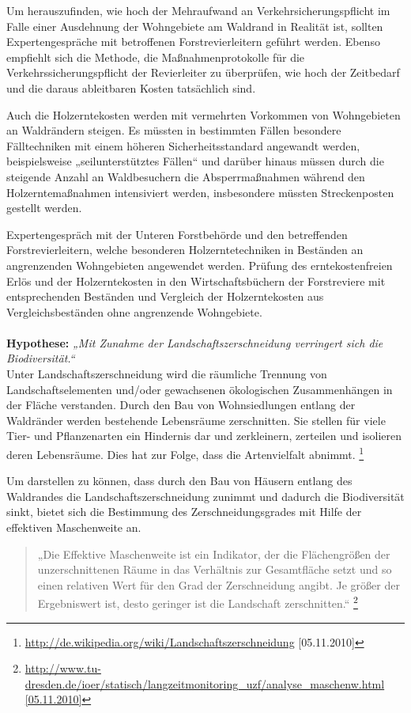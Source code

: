 \documentclass[12pt]{article}
\newcommand{\citefooturl}[1]{\footnote{\url{#1}}}
\newcommand{\citefooturldate}[2]{\footnote{\url{#1} [#2]}}
\begin{document}
Um herauszufinden, wie hoch der Mehraufwand an Verkehrsicherungspflicht im Falle einer Ausdehnung der 
Wohngebiete am Waldrand in Realität ist, sollten Expertengespräche mit betroffenen Forstrevierleitern 
geführt werden. Ebenso empfiehlt sich die Methode, die Maßnahmenprotokolle für die Verkehrssicherungspflicht 
der Revierleiter zu überprüfen, wie hoch der Zeitbedarf und die daraus ableitbaren Kosten tatsächlich sind.


Auch die Holzerntekosten werden mit vermehrten Vorkommen von Wohngebieten an Waldrändern steigen. Es müssten
in bestimmten Fällen besondere Fälltechniken mit einem höheren Sicherheitsstandard angewandt werden, 
beispielsweise „seilunterstütztes Fällen“ und darüber hinaus müssen durch die steigende Anzahl an Waldbesuchern 
die Absperrmaßnahmen während den Holzerntemaßnahmen intensiviert werden, insbesondere müssten Streckenposten 
gestellt werden.


Expertengespräch mit der Unteren Forstbehörde und den betreffenden Forstrevierleitern, welche besonderen 
Holzerntetechniken in Beständen an angrenzenden Wohngebieten angewendet werden. Prüfung des erntekostenfreien 
Erlös und der Holzerntekosten in den Wirtschaftsbüchern der Forstreviere mit entsprechenden Beständen und 
Vergleich der Holzerntekosten aus Vergleichsbeständen ohne angrenzende Wohngebiete. \\ \\


\noindent\textbf{Hypothese:}	\textit{„Mit Zunahme der Landschaftszerschneidung verringert sich die Biodiversität.“} \\

Unter Landschaftszerschneidung wird die räumliche Trennung von Landschaftselementen und/oder gewachsenen 
ökologischen Zusammenhängen in der Fläche verstanden.
Durch den Bau von Wohnsiedlungen entlang der Waldränder werden bestehende Lebensräume zerschnitten. 
Sie stellen für viele Tier- und Pflanzenarten ein Hindernis dar und zerkleinern, zerteilen und isolieren 
deren Lebensräume. Dies hat zur Folge, dass die Artenvielfalt abnimmt. 
\citefooturldate{http://de.wikipedia.org/wiki/Landschaftszerschneidung}{05.11.2010}

Um darstellen zu können, dass durch den Bau von Häusern entlang des Waldrandes die Landschaftszerschneidung 
zunimmt und dadurch die Biodiversität sinkt, bietet sich die Bestimmung des Zerschneidungsgrades mit Hilfe 
der effektiven Maschenweite an. 

\begin{quote}
„Die Effektive Maschenweite ist ein Indikator, der die Flächengrößen der unzerschnittenen Räume in das 
Verhältnis zur Gesamtfläche setzt und so einen relativen Wert für den Grad der Zerschneidung angibt. Je 
größer der Ergebniswert ist, desto geringer ist die Landschaft zerschnitten.“
\citefooturl{http://www.tu-dresden.de/ioer/statisch/langzeitmonitoring_uzf/analyse_maschenw.html [05.11.2010]}
\end{quote}
\end{document}
